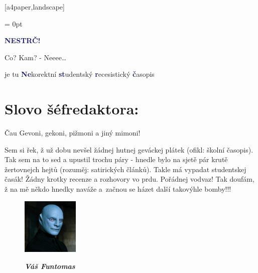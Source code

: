 \documentclass[twoside, 11pt]{article}
\begin{document}
[a4paper,landscape]

\addtolength{\topmargin}{-10pt}
\addtolength{\textheight}{10pt}
\headheight = 0pt
\begin{center}
    \fontsize{45}{48}\selectfont \textcolor{MidnightBlue}{\textbf{NESTRČ!}}
 \end{center}


\vspace{-\baselineskip}
 \large Co? Kam? - Neeee\dots
 \begin{flushright}
    je tu \textcolor{MidnightBlue}{\textbf{Ne}}korektní \textcolor{MidnightBlue}{\textbf{st}}udentský \textcolor{MidnightBlue}{\textbf{r}}ecesistický \textcolor{MidnightBlue}{\textbf{č}}asopis
 \end{flushright}
 \section*{Slovo šéfredaktora:}
 Čau Gevoni, gekoni, pižmoni a jiný mimoni!

 Sem si řek, ž už dobu nevšel žádnej hutnej geváckej plátek (ofikl: školní
 časopis). Tak sem na to sed a upustil trochu páry - hnedle bylo na sjetě pár
 krutě žertovnejch hejtů (rozuměj: satirických článků). Takle má vypadat
 studentskej časák! Žádny krotky recenze a rozhovory vo prdu. Pořádnej
 vodvaz! Tak doufám, ž na mě někdo hnedky naváže a~začnou se házet další
 takovýhle bomby!!! 

 \begin{figure}
    \vspace*{-13pt}
    \includegraphics[width=0.24\textwidth]{funtomas}
    \vspace*{-10pt}
    \begin{flushright}
        \footnotesize{
        \textit{
        \textbf{Váš Funtomas}}}
    \end{flushright}
\end{figure}
\end{document}
